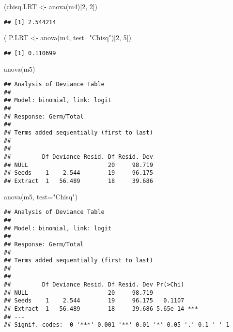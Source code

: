 \documentclass[
]{article}
\newenvironment{Shaded}{\begin{snugshade}}{\end{snugshade}}
\newcommand{\AttributeTok}[1]{\textcolor[rgb]{0.77,0.63,0.00}{#1}}
\newcommand{\DecValTok}[1]{\textcolor[rgb]{0.00,0.00,0.81}{#1}}
\newcommand{\FunctionTok}[1]{\textcolor[rgb]{0.00,0.00,0.00}{#1}}
\newcommand{\NormalTok}[1]{#1}
\newcommand{\OtherTok}[1]{\textcolor[rgb]{0.56,0.35,0.01}{#1}}
\newcommand{\StringTok}[1]{\textcolor[rgb]{0.31,0.60,0.02}{#1}}
\begin{document}
\begin{Shaded}
\begin{Highlighting}[]
\NormalTok{(chisq.LRT }\OtherTok{\textless{}{-}} \FunctionTok{anova}\NormalTok{(m4)[}\DecValTok{2}\NormalTok{, }\DecValTok{2}\NormalTok{])}
\end{Highlighting}
\end{Shaded}

\begin{verbatim}
## [1] 2.544214
\end{verbatim}

\begin{Shaded}
\begin{Highlighting}[]
\NormalTok{( P.LRT }\OtherTok{\textless{}{-}} \FunctionTok{anova}\NormalTok{(m4, }\AttributeTok{test=}\StringTok{"Chisq"}\NormalTok{)[}\DecValTok{2}\NormalTok{, }\DecValTok{5}\NormalTok{])}
\end{Highlighting}
\end{Shaded}

\begin{verbatim}
## [1] 0.110699
\end{verbatim}

\begin{Shaded}
\begin{Highlighting}[]
\FunctionTok{anova}\NormalTok{(m5)}
\end{Highlighting}
\end{Shaded}

\begin{verbatim}
## Analysis of Deviance Table
## 
## Model: binomial, link: logit
## 
## Response: Germ/Total
## 
## Terms added sequentially (first to last)
## 
## 
##         Df Deviance Resid. Df Resid. Dev
## NULL                       20     98.719
## Seeds    1    2.544        19     96.175
## Extract  1   56.489        18     39.686
\end{verbatim}

\begin{Shaded}
\begin{Highlighting}[]
\FunctionTok{anova}\NormalTok{(m5, }\AttributeTok{test=}\StringTok{"Chisq"}\NormalTok{)}
\end{Highlighting}
\end{Shaded}

\begin{verbatim}
## Analysis of Deviance Table
## 
## Model: binomial, link: logit
## 
## Response: Germ/Total
## 
## Terms added sequentially (first to last)
## 
## 
##         Df Deviance Resid. Df Resid. Dev Pr(>Chi)    
## NULL                       20     98.719             
## Seeds    1    2.544        19     96.175   0.1107    
## Extract  1   56.489        18     39.686 5.65e-14 ***
## ---
## Signif. codes:  0 '***' 0.001 '**' 0.01 '*' 0.05 '.' 0.1 ' ' 1
\end{verbatim}
\end{document}
